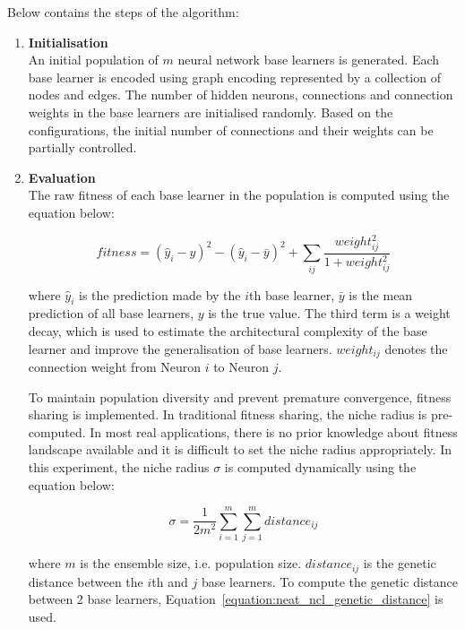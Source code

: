 Below contains the steps of the algorithm: 
\begin{enumerate}
    \item \textbf{Initialisation} \\
    An initial population of $m$ neural network base learners is generated. Each base learner is encoded using graph encoding represented by a collection of nodes and edges. The number of hidden neurons, connections and connection weights in the base learners are initialised randomly. Based on the configurations, the initial number of connections and their weights can be partially controlled. 

    \item \textbf{Evaluation} \\
    The raw fitness of each base learner in the population is computed using the equation below: 

    \begin{equation}
        \label{equation:neat_ncl_raw_fitness}
        fitness = (\hat{y}_i - y)^2 - (\hat{y}_i - \bar{y})^2 + \sum_{ij} \frac{weight_{ij}^2}{1 + weight_{ij}^2}
    \end{equation}

    where $\hat{y}_i$ is the prediction made by the $i$th base learner, $\bar{y}$ is the mean prediction of all base learners, $y$ is the true value. The third term is a weight decay, which is used to estimate the architectural complexity of the base learner and improve the generalisation of base learners. $weight_{ij}$ denotes the connection weight from Neuron $i$ to Neuron $j$. 

    To maintain population diversity and prevent premature convergence, fitness sharing is implemented. In traditional fitness sharing, the niche radius is pre-computed. In most real applications, there is no prior knowledge about fitness landscape available and it is difficult to set the niche radius appropriately. In this experiment, the niche radius $\sigma$ is computed dynamically using the equation below: 
    
    \begin{equation}
        \label{equation:neat_ncl_niche_radius}
        \sigma = \frac{1}{2 m^2} \sum_{i = 1}^{m} \sum_{j = 1}^{m} distance_{ij}
    \end{equation}

    where $m$ is the ensemble size, i.e. population size. $distance_{ij}$ is the genetic distance between the $i$th and $j$ base learners. To compute the genetic distance between 2 base learners, Equation~\ref{equation:neat_ncl_genetic_distance} is used. 
    

\end{enumerate}

